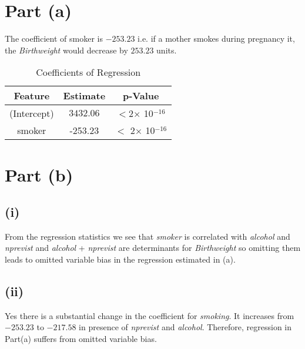 \documentclass{./solution}
\begin{document}
    \begin{solution}
        \section*{Part (a)}
            The coefficient of smoker is $-253.23$ i.e. if a mother smokes during
            pregnancy it, the \textit{Birthweight} would decrease by $253.23$ units.


            \begin{table}[H]
                \caption{Coefficients of Regression}
                \begin{tabularx}{\textwidth}{C C C}
                    \toprule
                    Feature & Estimate & p-Value \\
                    \midrule
                    (Intercept) & $3432.06$ &  $<$2$\times$ 10$^{-16}$ \\
                    smoker         &  -253.23 &   $<$ 2$\times$ 10$^{-16}$ \\

                    \bottomrule
                \end{tabularx}
            \end{table}
            \vspace{-5mm}

        \section*{Part (b)}
            \subsection*{  (i)}
            From the regression statistics we see that \textit{smoker} is correlated with \textit{alcohol} and \textit{nprevist} and \textit{alcohol} + \textit{nprevist} are determinants for \textit{Birthweight} so omitting
            them leads to  omitted variable bias in the regression estimated in (a).

            \subsection*{ (ii)}
            Yes there is a substantial change in the coefficient for \textit{smoking}.
            It increases from $-253.23$ to $-217.58$ in presence of \textit{nprevist} and \textit{alcohol}. Therefore, regression in Part(a)
            suffers from omitted variable bias.


\end{solution}
\end{document}
